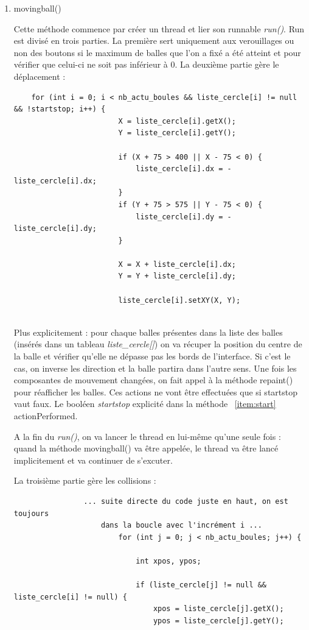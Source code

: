 \documentclass{article}
\begin{document}
\begin{enumerate}
\item movingball()

Cette méthode commence par créer un thread et  lier son runnable \textit{run()}. Run est divisé en trois parties. La première sert uniquement aux verouillages ou non des boutons si le maximum de balles que l'on a fixé a été atteint et pour vérifier que celui-ci ne soit pas inférieur à 0.
La deuxième partie gère le déplacement :

 \begin{verbatim}
	for (int i = 0; i < nb_actu_boules && liste_cercle[i] != null && !startstop; i++) {
						X = liste_cercle[i].getX();
						Y = liste_cercle[i].getY();

						if (X + 75 > 400 || X - 75 < 0) {
							liste_cercle[i].dx = -liste_cercle[i].dx;
						}
						if (Y + 75 > 575 || Y - 75 < 0) {
							liste_cercle[i].dy = -liste_cercle[i].dy;
						}

						X = X + liste_cercle[i].dx;
						Y = Y + liste_cercle[i].dy;

						liste_cercle[i].setXY(X, Y);
	
\end{verbatim}

Plus explicitement : pour chaque balles présentes dans la liste des balles (insérés dans un tableau \textit{liste\_cercle[]}) on va récuper la position du centre de la balle et vérifier qu'elle ne dépasse pas les bords de l'interface. Si c'est le cas, on inverse les direction et la balle partira dans l'autre sens. Une fois les composantes de mouvement changées, on fait appel à la méthode repaint() pour réafficher les balles. 
Ces actions ne vont être effectuées que si startstop vaut faux. Le booléen \textit{startstop} explicité dans la méthode ~\ref{item:start} actionPerformed.

A la fin du \textit{run()}, on va lancer le thread en lui-même qu'une seule fois : quand la méthode movingball() va être appelée, le thread va être lancé implicitement et va continuer de s'excuter.

La troisième partie gère les collisions :

\begin{verbatim}
				... suite directe du code juste en haut, on est toujours 
					dans la boucle avec l'incrément i ...
						for (int j = 0; j < nb_actu_boules; j++) {

							int xpos, ypos;

							if (liste_cercle[j] != null && liste_cercle[i] != null) {
								xpos = liste_cercle[j].getX();
								ypos = liste_cercle[j].getY();


\end{verbatim}
\end{enumerate}
\end{document}
